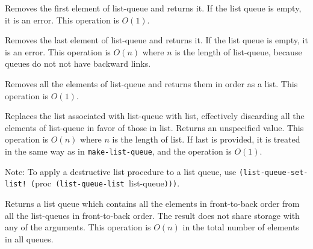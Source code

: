 \begin{entry}{%
  }

  Removes the first element of list-queue and returns it. If the list
  queue is empty, it is an error. This operation is $O(1)$.
\end{entry}

\begin{entry}{%
  }

  Removes the last element of list-queue and returns it. If the list
  queue is empty, it is an error. This operation is $O(n)$ where $n$ is
  the length of list-queue, because queues do not not have backward
  links.
\end{entry}

\begin{entry}{%
  }

  Removes all the elements of list-queue and returns them in order as
  a list. This operation is $O(1)$.
\end{entry}

\begin{entry}{%
  }

  Replaces the list associated with list-queue with list, effectively
  discarding all the elements of list-queue in favor of those in list.
  Returns an unspecified value. This operation is $O(n)$ where $n$ is the
  length of list. If last is provided, it is treated in the same way
  as in \texttt{make-list-queue}, and the operation is $O(1)$.

  Note: To apply a destructive list procedure to a list queue, use
  \texttt{(list-queue-set-list!\ (}proc\texttt{\ (list-queue-list\
  }list-queue\texttt{)))}.
\end{entry}

\begin{entry}{%
  }

  Returns a list queue which contains all the elements in
  front-to-back order from all the list-queues in front-to-back
  order. The result does not share storage with any of the
  arguments. This operation is $O(n)$ in the total number of elements in
  all queues.

\end{entry}


